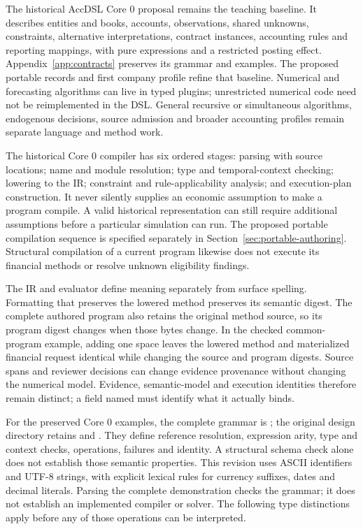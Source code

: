 The historical AccDSL Core 0 proposal remains the teaching baseline. It
describes entities and books, accounts, observations, shared unknowns,
constraints, alternative interpretations, contract instances, accounting
rules and reporting mappings, with pure expressions and a restricted posting
effect. Appendix~\ref{app:contracts} preserves its grammar and examples.
The proposed portable records and first company profile refine that baseline.
Numerical and forecasting algorithms can live in typed plugins; unrestricted
numerical code need not be reimplemented in the DSL. General recursive or
simultaneous algorithms, endogenous decisions, source admission and broader
accounting profiles remain separate language and method work.

The historical Core 0 compiler has six ordered stages: parsing with source
locations; name and module resolution; type and temporal-context checking;
lowering to the IR; constraint and rule-applicability analysis; and
execution-plan construction. It never silently supplies an economic
assumption to make a program compile. A valid historical representation can
still require additional assumptions before a particular simulation can run.
The proposed portable compilation sequence is specified separately in
Section~\ref{sec:portable-authoring}. Structural compilation of a current
program likewise does not execute its financial methods or resolve unknown
eligibility findings.

The IR and evaluator define meaning separately from surface spelling.
Formatting that preserves the lowered method preserves its semantic digest.
The complete authored program also retains the original method source, so its
program digest changes when those bytes change. In the checked common-program
example, adding one space leaves the lowered method and materialized financial
request identical while changing the source and program digests. Source spans
and reviewer decisions can change evidence provenance without changing the
numerical model. Evidence, semantic-model and execution identities therefore
remain distinct; a field named  must identify what it actually binds.

For the preserved Core 0 examples, the complete grammar is
; the original design directory retains
 and .
They define reference resolution, expression arity, type and context checks,
operations, failures and identity. A structural schema check alone does not
establish those semantic properties. This revision uses ASCII identifiers and
UTF-8 strings, with explicit lexical rules for currency suffixes, dates and
decimal literals. Parsing the complete demonstration checks the grammar; it
does not establish an implemented compiler or solver. The following type
distinctions apply before any of those operations can be interpreted.

